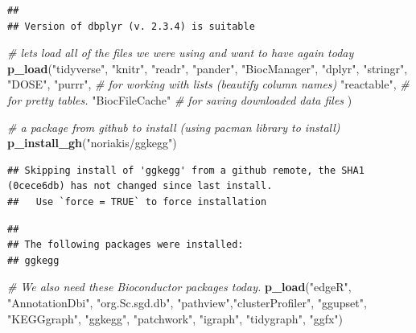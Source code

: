 \documentclass[
]{book}
\newenvironment{Shaded}{\begin{snugshade}}{\end{snugshade}}
\newcommand{\CommentTok}[1]{\textcolor[rgb]{0.56,0.35,0.01}{\textit{#1}}}
\newcommand{\FunctionTok}[1]{\textcolor[rgb]{0.13,0.29,0.53}{\textbf{#1}}}
\newcommand{\NormalTok}[1]{#1}
\newcommand{\StringTok}[1]{\textcolor[rgb]{0.31,0.60,0.02}{#1}}
\begin{document}
\begin{verbatim}
## 
## Version of dbplyr (v. 2.3.4) is suitable
\end{verbatim}

\begin{Shaded}
\begin{Highlighting}[]
\CommentTok{\# let\textquotesingle{}s load all of the files we were using and want to have again today}
\FunctionTok{p\_load}\NormalTok{(}\StringTok{"tidyverse"}\NormalTok{, }\StringTok{"knitr"}\NormalTok{, }\StringTok{"readr"}\NormalTok{,}
       \StringTok{"pander"}\NormalTok{, }\StringTok{"BiocManager"}\NormalTok{, }
       \StringTok{"dplyr"}\NormalTok{, }\StringTok{"stringr"}\NormalTok{, }\StringTok{"DOSE"}\NormalTok{,}
       \StringTok{"purrr"}\NormalTok{, }\CommentTok{\# for working with lists (beautify column names)}
       \StringTok{"reactable"}\NormalTok{, }\CommentTok{\# for pretty tables.}
       \StringTok{"BiocFileCache"} \CommentTok{\# for saving downloaded data files}
\NormalTok{       ) }

\CommentTok{\# a package from github to install (using pacman library to install)}
\FunctionTok{p\_install\_gh}\NormalTok{(}\StringTok{"noriakis/ggkegg"}\NormalTok{)}
\end{Highlighting}
\end{Shaded}

\begin{verbatim}
## Skipping install of 'ggkegg' from a github remote, the SHA1 (0cece6db) has not changed since last install.
##   Use `force = TRUE` to force installation
\end{verbatim}

\begin{verbatim}
## 
## The following packages were installed:
## ggkegg
\end{verbatim}

\begin{Shaded}
\begin{Highlighting}[]
\CommentTok{\# We also need these Bioconductor packages today.}
\FunctionTok{p\_load}\NormalTok{(}\StringTok{"edgeR"}\NormalTok{, }
       \StringTok{"AnnotationDbi"}\NormalTok{, }\StringTok{"org.Sc.sgd.db"}\NormalTok{, }
       \StringTok{"pathview"}\NormalTok{,}\StringTok{"clusterProfiler"}\NormalTok{, }\StringTok{"ggupset"}\NormalTok{,}
       \StringTok{"KEGGgraph"}\NormalTok{, }\StringTok{"ggkegg"}\NormalTok{, }\StringTok{"patchwork"}\NormalTok{,}
       \StringTok{"igraph"}\NormalTok{, }\StringTok{"tidygraph"}\NormalTok{, }\StringTok{"ggfx"}\NormalTok{)}
\end{Highlighting}
\end{Shaded}
\end{document}
